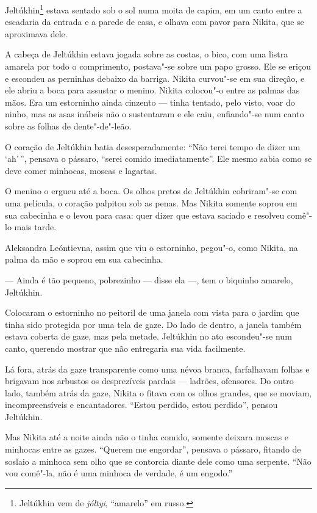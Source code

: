 Jeltúkhin\footnote{Jeltúkhin vem de \emph{jóltyi}, ``amarelo'' em russo.}
estava sentado sob o sol numa moita de capim, em um canto entre a
escadaria da entrada e a parede de casa, e olhava com pavor para Nikita, que se
aproximava dele.

A cabeça de Jeltúkhin estava jogada sobre as costas, o bico, com uma
listra amarela por todo o comprimento, postava"-se sobre um papo grosso.
Ele se eriçou e escondeu as perninhas debaixo da barriga. Nikita
curvou"-se em sua direção, e ele abriu a boca para assustar o menino.
Nikita colocou"-o entre as palmas das mãos. Era um estorninho ainda
cinzento --- tinha tentado, pelo visto, voar do ninho, mas as asas
inábeis não o sustentaram e ele caiu, enfiando"-se num canto sobre as
folhas de dente"-de"-leão.

O coração de Jeltúkhin batia desesperadamente: ``Não terei tempo de
dizer um `ah'\,'', pensava o pássaro, ``serei comido imediatamente''. Ele mesmo
sabia como se deve comer minhocas, moscas e lagartas.

O menino o ergueu até a boca. Os olhos pretos de Jeltúkhin cobriram"-se
com uma película, o coração palpitou sob as penas. Mas Nikita somente
soprou em sua cabecinha e o levou para casa: quer dizer que estava
saciado e resolveu comê"-lo mais tarde.

Aleksandra Leóntievna, assim que viu o estorninho, pegou"-o, como Nikita,
na palma da mão e soprou em sua cabecinha.

--- Ainda é tão pequeno, pobrezinho --- disse ela ---, tem o biquinho
amarelo, Jeltúkhin.

Colocaram o estorninho no peitoril de uma janela com vista para o jardim
que tinha sido protegida por uma tela de gaze. Do lado de dentro, a
janela também estava coberta de gaze, mas pela metade. Jeltúkhin no ato
escondeu"-se num canto, querendo mostrar que não entregaria sua vida
facilmente.

Lá fora, atrás da gaze transparente como uma névoa branca, farfalhavam
folhas e brigavam nos arbustos os desprezíveis pardais --- ladrões,
ofensores. Do outro lado, também atrás da gaze, Nikita o fitava com os
olhos grandes, que se moviam, incompreensíveis e encantadores. ``Estou
perdido, estou perdido'', pensou Jeltúkhin.

Mas Nikita até a noite ainda não o tinha comido, somente deixara moscas
e minhocas entre as gazes. ``Querem me engordar'', pensava o pássaro,
fitando de soslaio a minhoca sem olho que se contorcia diante dele
como uma serpente. ``Não vou comê"-la, não é uma minhoca de verdade, é um
engodo.''

